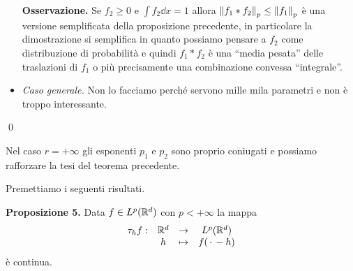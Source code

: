 \begin{itemize}
		\textbf{Osservazione.}
		Se $f_2 \geq 0$ e $\int f_2 \dd x = 1$ allora $\left\lVert f_1 \ast f_2 \right\rVert_p \leq \left\lVert f_1 \right\rVert_p$ è una versione semplificata della proposizione precedente, in particolare la dimostrazione si semplifica in quanto possiamo pensare a $f_2$ come distribuzione di probabilità e quindi $f_1 \ast f_2$ è una ``media pesata'' delle traslazioni di $f_1$ o più precisamente una combinazione convessa ``integrale''.

	\item
		\textit{Caso generale.} Non lo facciamo perché servono mille mila parametri e non è troppo interessante.
\end{itemize}
\qed

Nel caso $r = +\infty$ gli esponenti $p_1$ e $p_2$ sono proprio coniugati e possiamo rafforzare la tesi del teorema precedente.


Premettiamo i seguenti risultati.

\textbf{Proposizione 5.}
Data $f \in L^p(\mathbb R^d)$ con $p < +\infty$ la mappa
$$
\begin{array}{cccc}
	\tau_h f : & \mathbb R^d & \to & L^p(\mathbb R^d) \\
	& h & \mapsto & f(\,\cdot\, - h)
\end{array}
$$
è continua.

